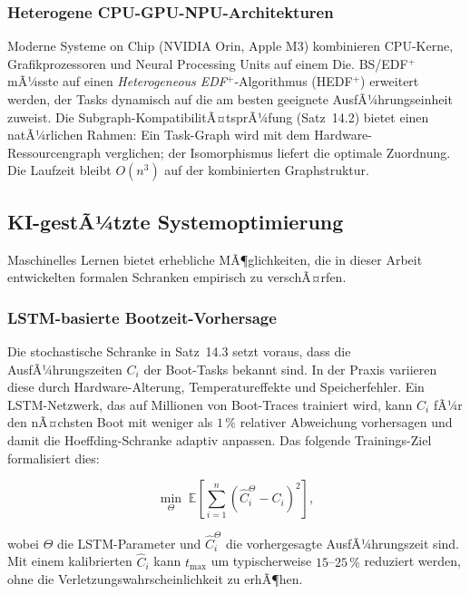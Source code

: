 ﻿\documentclass[a4paper,12pt]{scrreprt}
\theoremstyle{definition}
\begin{document}
	\subsubsection{Heterogene CPU-GPU-NPU-Architekturen}
	
	Moderne Systeme on Chip (NVIDIA Orin, Apple M3) kombinieren CPU-Kerne,
	Grafik\-prozessoren und Neural Processing Units auf einem Die.
	BS/EDF$^+$ mÃ¼sste auf einen \emph{Heterogeneous EDF$^+$}-Algorithmus
	(HEDF$^+$) erweitert werden, der Tasks dynamisch auf die am besten
	geeignete AusfÃ¼hrungseinheit zuweist. Die Subgraph-KompatibilitÃ¤tsprÃ¼fung
	(Satz~14.2) bietet einen natÃ¼rlichen Rahmen: Ein Task-Graph wird mit
	dem Hardware-Ressourcengraph verglichen; der Isomorphismus liefert
	die optimale Zuordnung. Die Laufzeit bleibt $O(n^3)$ auf der
	kombinierten Graphstruktur.
	
	\subsection{KI-gestÃ¼tzte Systemoptimierung}
	
	Maschinelles Lernen bietet erhebliche MÃ¶glichkeiten, die in dieser Arbeit
	entwickelten formalen Schranken empirisch zu verschÃ¤rfen.
	
	\subsubsection{LSTM-basierte Bootzeit-Vorhersage}
	
	Die stochastische Schranke in Satz~14.3 setzt voraus, dass die
	AusfÃ¼hrungszeiten $C_i$ der Boot-Tasks bekannt sind. In der Praxis
	variieren diese durch Hardware-Alterung, Temperatureffekte und
	Speicherfehler. Ein LSTM-Netzwerk, das auf Millionen von Boot-Traces
	trainiert wird, kann $C_i$ fÃ¼r den nÃ¤chsten Boot mit weniger als
	$1\,\%$ relativer Abweichung vorhersagen und damit die Hoeffding-Schranke
	adaptiv anpassen. Das folgende Trainings-Ziel formalisiert dies:
	
	\[
	\min_{\Theta}\; \mathbb{E}\!\left[\sum_{i=1}^{n}
	\left(\hat{C}_i^{\Theta} - C_i\right)^2\right],
	\]
	
	wobei $\Theta$ die LSTM-Parameter und $\hat{C}_i^{\Theta}$ die vorhergesagte
	AusfÃ¼hrungszeit sind. Mit einem kalibrierten $\hat{C}_i$ kann
	$t_{\max}$ um typischerweise $15$--$25\,\%$ reduziert werden, ohne die
	Verletzungswahrscheinlichkeit zu erhÃ¶hen.
	
\end{document}
